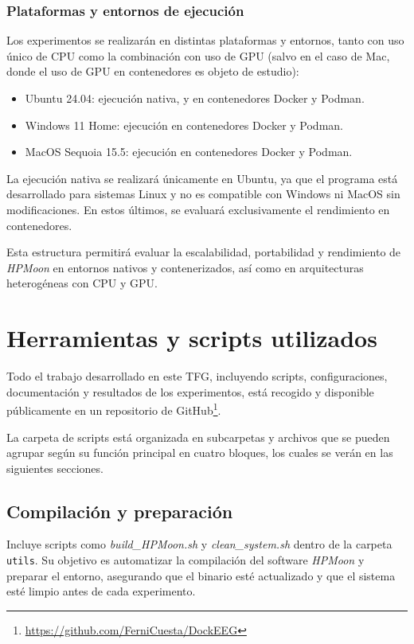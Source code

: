 \subsubsection{Plataformas y entornos de ejecución}

Los experimentos se realizarán en distintas plataformas y entornos, tanto con uso único de CPU como la combinación con uso de GPU (salvo en el caso de Mac, donde el uso de GPU en contenedores es objeto de estudio):

\begin{itemize}
    \item Ubuntu 24.04: ejecución nativa, y en contenedores Docker y Podman.
    \item Windows 11 Home: ejecución en contenedores Docker y Podman.
    \item MacOS Sequoia 15.5: ejecución en contenedores Docker y Podman.
\end{itemize}

La ejecución nativa se realizará únicamente en Ubuntu, ya que el programa está desarrollado para sistemas Linux y no es compatible con Windows ni MacOS sin modificaciones. En estos últimos, se evaluará exclusivamente el rendimiento en contenedores.

Esta estructura permitirá evaluar la escalabilidad, portabilidad y rendimiento de \textit{HPMoon} en entornos nativos y contenerizados, así como en arquitecturas heterogéneas con CPU y GPU.

\section{Herramientas y scripts utilizados}\label{sec:herramientas_scripts}

Todo el trabajo desarrollado en este TFG, incluyendo scripts, configuraciones, documentación y resultados de los experimentos, está recogido y disponible públicamente en un repositorio de GitHub\footnote{\url{https://github.com/FerniCuesta/DockEEG}}.

La carpeta de scripts está organizada en subcarpetas y archivos que se pueden agrupar según su función principal en cuatro bloques, los cuales se verán en las siguientes secciones.

\subsection{Compilación y preparación}
Incluye scripts como \textit{build\_HPMoon.sh} y \textit{clean\_system.sh} dentro de la carpeta \texttt{utils}. Su objetivo es automatizar la compilación del software \textit{HPMoon} y preparar el entorno, asegurando que el binario esté actualizado y que el sistema esté limpio antes de cada experimento.

